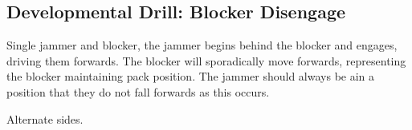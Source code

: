 \subsection*{Developmental Drill: Blocker Disengage}
\label{drill:one_on_one/developmental/blocker_disengage}

Single jammer and blocker, the jammer begins behind the blocker and engages, driving them forwards.
The blocker will sporadically move forwards, representing the blocker maintaining pack position. The jammer should always be ain a position that they do not fall forwards as this occurs.

Alternate sides.

